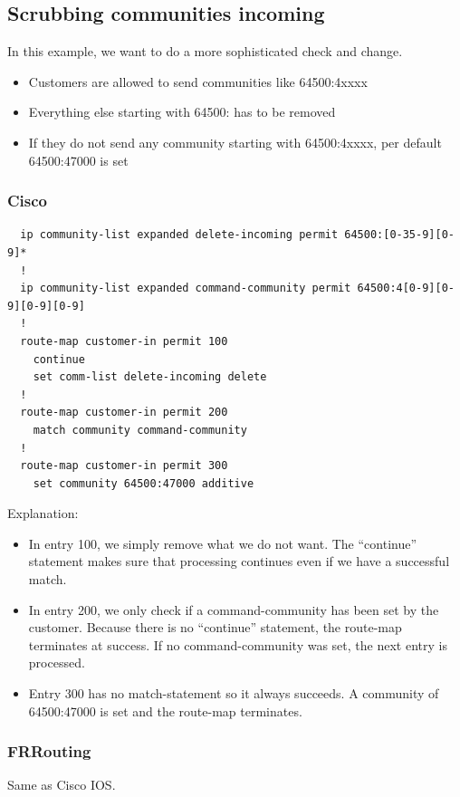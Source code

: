 \subsection{Scrubbing communities incoming}
In this example, we want to do a more sophisticated check and change.
\begin{itemize}
  \item Customers are allowed to send communities like 64500:4xxxx
  \item Everything else starting with 64500: has to be removed
  \item If they do not send any community starting with 64500:4xxxx, per default 64500:47000 is set
\end{itemize}

\subsubsection{Cisco}
\begin{verbatim}
  ip community-list expanded delete-incoming permit 64500:[0-35-9][0-9]*
  !
  ip community-list expanded command-community permit 64500:4[0-9][0-9][0-9][0-9]
  !
  route-map customer-in permit 100
    continue
    set comm-list delete-incoming delete
  !
  route-map customer-in permit 200
    match community command-community
  !
  route-map customer-in permit 300
    set community 64500:47000 additive
\end{verbatim}
Explanation:
\begin{itemize}
  \item In entry 100, we simply remove what we do not want. The ``continue'' statement makes sure that processing continues even if we have a successful match.
  \item In entry 200, we only check if a command-community has been set by the customer. Because there is no ``continue'' statement, the route-map terminates at success. If no command-community was set, the next entry is processed.
  \item Entry 300 has no match-statement so it always succeeds. A community of 64500:47000 is set and the route-map terminates.
\end{itemize}

\subsubsection{FRRouting}
Same as Cisco IOS.

